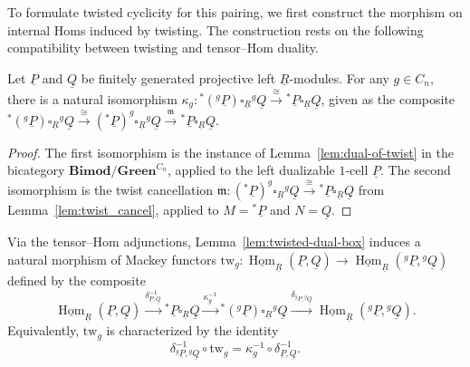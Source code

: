 \documentclass[11pt,oneside]{amsart}
\DeclareMathOperator{\Hom}{Hom}
\numberwithin{equation}{section}
\numberwithin{figure}{section}
\theoremstyle{plain}
\theoremstyle{definition}
\theoremstyle{remark}
\begin{document}
To formulate twisted cyclicity for this pairing, we first construct
the morphism on internal Homs induced by twisting. The construction
rests on the following compatibility between twisting and
tensor--Hom duality.
 



\begin{lemma}\label{lem:twisted-dual-box}
Let $\underline{P}$ and $\underline{Q}$ be finitely generated projective left $\underline{R}$-modules. For any $g \in C_n$, there is a natural isomorphism $\kappa_{g}\colon {}^*({}^g\underline{P}) \square_{\underline{R}} {}^g\underline{Q} \xrightarrow{\cong} {}^*\underline{P} \square_{\underline{R}} \underline{Q}$, given as the composite \({}^*({}^g\underline{P}) \square_{\underline{R}} {}^g\underline{Q} \xrightarrow{\cong} ({}^*\underline{P})^g \square_{\underline{R}} {}^g\underline{Q} \xrightarrow{\mathfrak{m}} {}^*\underline{P} \square_{\underline{R}} \underline{Q}.\)
\end{lemma}

\begin{proof}
The first isomorphism is the instance of Lemma~\ref{lem:dual-of-twist} in the bicategory $\mathbf{Bimod}/\mathbf{Green}^{C_n}$, applied to the left dualizable $1$-cell $\underline{P}$. The second isomorphism is the twist cancellation $\mathfrak{m}\colon ({}^*\underline{P})^g \square_{\underline{R}} {}^g\underline{Q} \xrightarrow{\cong} {}^*\underline{P} \square_{\underline{R}} \underline{Q}$ from Lemma~\ref{lem:twist_cancel}, applied to $M = {}^*\underline{P}$ and $N = \underline{Q}$. 
\end{proof}




Via the tensor--Hom adjunctions, Lemma~\ref{lem:twisted-dual-box} induces a natural morphism of Mackey functors $\mathrm{tw}_g\colon \underline{\Hom}_{\underline R}(\underline P,\underline Q) \to \underline{\Hom}_{\underline R}({}^{g}\underline P,{}^{g}\underline Q)$ defined by the composite \[\underline{\Hom}_{\underline R}(\underline P,\underline Q) \xrightarrow{\delta^{-1}_{\underline P,\underline Q}} {}^{*}\underline P \square_{\underline R} \underline Q \xrightarrow{\kappa_{g}^{-1}} {}^{*}({}^{g}\underline P)\square_{\underline R} {}^{g}\underline Q \xrightarrow{\delta_{{}^{g}\underline P,{}^{g}\underline Q}} \underline{\Hom}_{\underline R}({}^{g}\underline P,{}^{g}\underline Q).\] Equivalently, $\mathrm{tw}_g$ is characterized by the identity
\begin{equation}\label{eq:twg-characterization}
\delta^{-1}_{{}^{g}\underline P,{}^{g}\underline Q}\circ \mathrm{tw}_g = \kappa_{g}^{-1}\circ \delta^{-1}_{\underline P,\underline Q}.
\end{equation}
\end{document}
